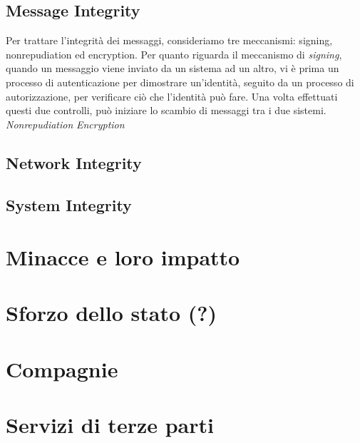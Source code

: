 \subsection{Message Integrity}
Per trattare l'integrità dei messaggi, consideriamo tre meccanismi: signing, nonrepudiation ed encryption.
Per quanto riguarda il meccanismo di \textit{signing}, quando un messaggio viene inviato da un sistema ad un altro, vi è prima un processo di autenticazione per dimostrare un'identità, seguito da un processo di autorizzazione, per verificare ciò che l'identità può fare. Una volta effettuati questi due controlli, può iniziare lo scambio di messaggi tra i due sistemi.
\textit{Nonrepudiation}
\textit{Encryption}

\subsection{Network Integrity}
\subsection{System Integrity}


\section{Minacce e loro impatto}

\section{Sforzo dello stato (?)}

\section{Compagnie}

\section{Servizi di terze parti}

